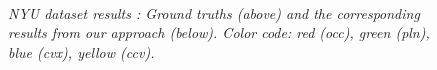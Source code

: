 \begin{figure}[ht]
    \hfill
    \\
   \addtocounter{subfigure}{-5}

   \caption{\it NYU dataset results : Ground truths (above) and the corresponding results from our approach (below).
   Color code: red (occ), green (pln), blue (cvx), yellow (ccv).}
\label{fig:nyuResults}
\end{figure}

